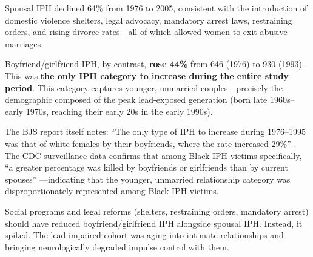 \documentclass[12pt, letterpaper]{article}
\begin{document}
Spousal IPH declined 64\% from 1976 to 2005, consistent with the introduction of domestic violence shelters, legal advocacy, mandatory arrest laws, restraining orders, and rising divorce rates---all of which allowed women to exit abusive marriages.

Boyfriend/girlfriend IPH, by contrast, \textbf{rose 44\%} from 646 (1976) to 930 (1993). This was \textbf{the only IPH category to increase during the entire study period}. This category captures younger, unmarried couples---precisely the demographic composed of the peak lead-exposed generation (born late 1960s--early 1970s, reaching their early 20s in the early 1990s).

The BJS report itself notes: ``The only type of IPH to increase during 1976--1995 was that of white females by their boyfriends, where the rate increased 29\%'' \citep{puzone2000}. The CDC surveillance data confirms that among Black IPH victims specifically, ``a greater percentage was killed by boyfriends or girlfriends than by current spouses'' \citep{paulozzi2001}---indicating that the younger, unmarried relationship category was disproportionately represented among Black IPH victims.

Social programs and legal reforms (shelters, restraining orders, mandatory arrest) should have reduced boyfriend/girlfriend IPH alongside spousal IPH. Instead, it spiked. The lead-impaired cohort was aging into intimate relationships and bringing neurologically degraded impulse control with them.
\end{document}
